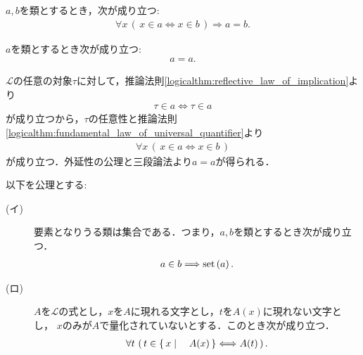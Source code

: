 	\begin{screen}
		\begin{axm}[外延性の公理]
			$a,b$を類とするとき，次が成り立つ:
			\begin{align}
				\forall x\, (\, x \in a  \Longleftrightarrow x \in b\, )
				\Longrightarrow a=b.
			\end{align}
		\end{axm}
	\end{screen}
	
	\begin{screen}
		\begin{thm}[任意の類は自分自身と等しい]\label{thm:any_class_equals_to_itself}
			$a$を類とするとき次が成り立つ:
			\begin{align}
				a = a.
			\end{align}
		\end{thm}
	\end{screen}
	
	\begin{prf}
		$\mathcal{L}$の任意の対象$\tau$に対して，推論法則\ref{logicalthm:reflective_law_of_implication}より
		\begin{align}
			\tau \in a \Longleftrightarrow \tau \in a
		\end{align}
		が成り立つから，$\tau$の任意性と推論法則\ref{logicalthm:fundamental_law_of_universal_quantifier}より
		\begin{align}
			\forall x\, (\, x \in a  \Longleftrightarrow x \in b\, )
		\end{align}
		が成り立つ．外延性の公理と三段論法より$a = a$が得られる．
		\QED
	\end{prf}
	
	\begin{screen}
		\begin{axm}[類の公理] 以下を公理とする:
			\begin{description}
				\item[(イ)] 要素となりうる類は集合である．つまり，$a,b$を類とするとき次が成り立つ．
					\begin{align}
						a \in b \Longrightarrow \operatorname*{set} \left(a\right).
					\end{align}
					
					
				\item[(ロ)] $A$を$\mathcal{L}$の式とし，$x$を$A$に現れる文字とし，$t$を$A(x)$に現れない文字とし，
					$x$のみが$A$で量化されていないとする．このとき次が成り立つ．
					\begin{align}
						\forall t\, \left(\, t \in \left\{\, x \mid \quad A(x)\, \right\} \Longleftrightarrow A(t)\, \right).
					\end{align}
			\end{description}
		\end{axm}
	\end{screen}
	
